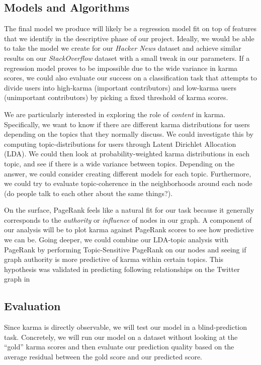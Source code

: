 \documentclass[10pt]{article}
\begin{document}
\subsection{Models and Algorithms}
\label{sec:models}
The final model we produce will likely be a regression model fit on top of
features that we identify in the descriptive phase of our project. Ideally, we
would be able to take the model we create for our \textit{Hacker News} dataset
and achieve similar results on our \textit{StackOverflow} dataset with a small tweak
in our parameters. If a regression model proves to be impossible due to the wide
variance in karma scores, we could also evaluate our success on a classification
task that attempts to divide users into high-karma (important contributors) and
low-karma users (unimportant contributors) by picking a fixed threshold of karma
scores.

We are particularly interested in exploring the role of \textit{content} in
karma. Specifically, we want to know if there are different karma distributions
for users depending on the topics that they normally discuss. We could
investigate this by computing topic-distributions for users through Latent
Dirichlet Allocation (LDA). We could then look at probability-weighted karma
distributions in each topic, and see if there is a wide variance between topics.
Depending on the answer, we could consider creating different models for each
topic. Furthermore, we could try to evaluate topic-coherence in the
neighborhoods around each node (do people talk to each other about the same
things?).

On the surface, PageRank feels like a natural fit for our task because it
generally corresponds to the \textit{authority} or \textit{influence} of nodes
in our graph. A component of our analysis will be to plot karma against PageRank
scores to see how predictive we can be.  Going deeper, we could combine our
LDA-topic analysis with PageRank by performing Topic-Sensitive PageRank
\citep{haveliwala2002topic} on our nodes and seeing if graph authority is more
predictive of karma within certain topics. This hypothesis was validated in
predicting following relationships on the Twitter graph in
\citet{weng2010twitterrank}

\subsection{Evaluation}
Since karma is directly observable, we will test our model in a
blind-prediction task. Concretely, we will run our model on a dataset without
looking at the ``gold'' karma scores and then evaluate our prediction quality
based on the average residual between the gold score and our predicted score.
\end{document}
